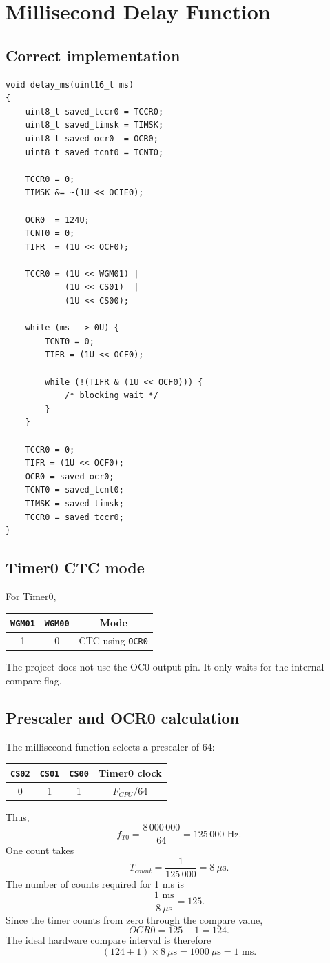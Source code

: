\documentclass[11pt,a4paper]{article}
\begin{document}
\section{Millisecond Delay Function}
\subsection{Correct implementation}
\begin{lstlisting}[style=cstyle,caption={Timer0-based blocking millisecond delay.}]
void delay_ms(uint16_t ms)
{
    uint8_t saved_tccr0 = TCCR0;
    uint8_t saved_timsk = TIMSK;
    uint8_t saved_ocr0  = OCR0;
    uint8_t saved_tcnt0 = TCNT0;

    TCCR0 = 0;
    TIMSK &= ~(1U << OCIE0);

    OCR0  = 124U;
    TCNT0 = 0;
    TIFR  = (1U << OCF0);

    TCCR0 = (1U << WGM01) |
            (1U << CS01)  |
            (1U << CS00);

    while (ms-- > 0U) {
        TCNT0 = 0;
        TIFR = (1U << OCF0);

        while (!(TIFR & (1U << OCF0))) {
            /* blocking wait */
        }
    }

    TCCR0 = 0;
    TIFR = (1U << OCF0);
    OCR0 = saved_ocr0;
    TCNT0 = saved_tcnt0;
    TIMSK = saved_timsk;
    TCCR0 = saved_tccr0;
}
\end{lstlisting}

\subsection{Timer0 CTC mode}
For Timer0,
\begin{center}
\begin{tabular}{ccc}
\toprule
\texttt{WGM01} & \texttt{WGM00} & Mode \\
\midrule
1 & 0 & CTC using \texttt{OCR0} \\
\bottomrule
\end{tabular}
\end{center}
The project does not use the OC0 output pin. It only waits for the internal compare flag.

\subsection{Prescaler and OCR0 calculation}
The millisecond function selects a prescaler of 64:
\begin{center}
\begin{tabular}{cccc}
\toprule
\texttt{CS02} & \texttt{CS01} & \texttt{CS00} & Timer0 clock \\
\midrule
0 & 1 & 1 & \(F_{CPU}/64\) \\
\bottomrule
\end{tabular}
\end{center}
Thus,
\[
f_{T0}=\frac{8\,000\,000}{64}=125\,000\text{ Hz}.
\]
One count takes
\[
T_{count}=\frac{1}{125\,000}=8\ \mu\text{s}.
\]
The number of counts required for 1 ms is
\[
\frac{1\text{ ms}}{8\ \mu\text{s}}=125.
\]
Since the timer counts from zero through the compare value,
\[
OCR0=125-1=124.
\]
The ideal hardware compare interval is therefore
\[
(124+1)\times8\ \mu\text{s}=1000\ \mu\text{s}=1\text{ ms}.
\]
\end{document}

